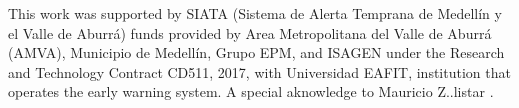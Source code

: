 \documentclass{ametsoc}
\begin{document}
\acknowledgments
This work was supported by SIATA (Sistema de Alerta Temprana de Medellín y el Valle de Aburrá) funds provided by Area Metropolitana del Valle de Aburrá (AMVA), Municipio de Medellín, Grupo EPM, and ISAGEN under the Research and Technology Contract CD511, 2017, with Universidad EAFIT, institution that operates the early warning system. A special aknowledge to Mauricio Z..listar \citep{Hunter2007}.











\end{document}
